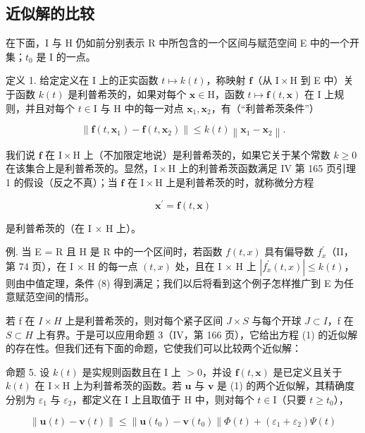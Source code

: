 \subsection{近似解的比较}

在下面，I 与 H 仍如前分别表示 R 中所包含的一个区间与赋范空间 E 中的一个开集；\(t_{0}\) 是 I 的一点。

定义 1. 给定定义在 I 上的正实函数 \(t \mapsto k(t)\)，称映射 \(\mathbf{f}\)（从 \(\mathrm{I} \times \mathrm{H}\) 到 E 中）关于函数 \(k(t)\) 是利普希茨的，如果对每个 \(\mathbf{x} \in \mathrm{H}\)，函数 \(t \mapsto \mathbf{f}(t, \mathbf{x})\) 在 I 上规则，并且对每个 \(t \in \mathrm{I}\) 与 H 中的每一对点 \(\mathbf{x}_1, \mathbf{x}_2\)，有（“利普希茨条件”）

\[
\left\| \mathbf {f} (t, \mathbf {x} _ {1}) - \mathbf {f} (t, \mathbf {x} _ {2}) \right\| \leqslant k (t) \left\| \mathbf {x} _ {1} - \mathbf {x} _ {2} \right\|.\tag{8}
\]

我们说 \(\mathbf{f}\) 在 \(\mathrm{I} \times \mathrm{H}\) 上（不加限定地说）是利普希茨的，如果它关于某个常数 \(k \geqslant 0\) 在该集合上是利普希茨的。显然，\(\mathrm{I} \times \mathrm{H}\) 上的利普希茨函数满足 IV 第 165 页引理 1 的假设（反之不真）；当 \(\mathbf{f}\) 在 \(\mathrm{I} \times \mathrm{H}\) 上是利普希茨的时，就称微分方程

\[
\mathbf {x} ^ {\prime} = \mathbf {f} (t, \mathbf {x})\tag{1}
\]

是利普希茨的（在 I × H 上）。

例. 当 E = R 且 H 是 R 中的一个区间时，若函数 \(f(t, x)\) 具有偏导数 \(f_{x}^{\prime}\)（II，第 74 页），在 I × H 的每一点 \((t, x)\) 处，且在 I × H 上 \(|f_{x}^{\prime}(t, x)| \leqslant k(t)\)，则由中值定理，条件 (8) 得到满足；我们以后将看到这个例子怎样推广到 E 为任意赋范空间的情形。

若 f 在 \(I \times H\) 上是利普希茨的，则对每个紧子区间 \(J \times S\) 与每个开球 \(J \subset I\)，f 在 \(S \subset H\) 上有界。于是可以应用命题 3（IV，第 166 页），它给出方程 (1) 的近似解的存在性。但我们还有下面的命题，它使我们可以比较两个近似解：

命题 5. 设 \(k(t)\) 是实规则函数且在 I 上 \(>0\)，并设 \(\mathbf{f}(t, \mathbf{x})\) 是已定义且关于 \(k(t)\) 在 \(\mathrm{I} \times \mathrm{H}\) 上为利普希茨的函数。若 \(\mathbf{u}\) 与 \(\mathbf{v}\) 是 (1) 的两个近似解，其精确度分别为 \(\varepsilon_1\) 与 \(\varepsilon_2\)，都定义在 I 上且取值于 H 中，则对每个 \(t \in \mathrm{I}\)（只要 \(t \geqslant t_0\)），

\[
\left\| \mathbf {u} (t) - \mathbf {v} (t) \right\| \leqslant \left\| \mathbf {u} \left(t _ {0}\right) - \mathbf {v} \left(t _ {0}\right) \right\| \Phi (t) + \left(\varepsilon_ {1} + \varepsilon_ {2}\right) \Psi (t)\tag{9}
\]


